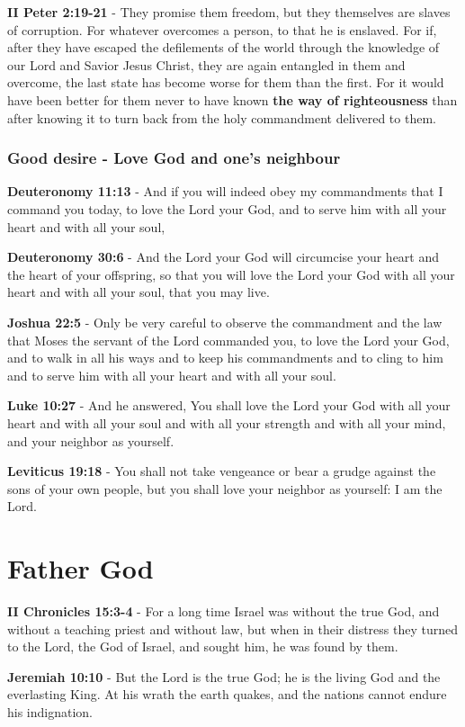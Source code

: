\documentclass[11pt]{article}
\begin{document}
\textbf{II Peter 2:19-21} - They promise them freedom, but they themselves are slaves of corruption. For whatever overcomes a person, to that he is enslaved. For if, after they have escaped the defilements of the world through the knowledge of our Lord and Savior Jesus Christ, they are again entangled in them and overcome, the last state has become worse for them than the first. For it would have been better for them never to have known \textbf{the way of righteousness} than after knowing it to turn back from the holy commandment delivered to them.

\subsubsection{Good desire - Love God and one's neighbour}
\label{sec:org56139a3}
\textbf{Deuteronomy 11:13} - And if you will indeed obey my commandments that I command you today, to love the Lord your God, and to serve him with all your heart and with all your soul,

\textbf{Deuteronomy 30:6} - And the Lord your God will circumcise your heart and the heart of your offspring, so that you will love the Lord your God with all your heart and with all your soul, that you may live.

\textbf{Joshua 22:5} - Only be very careful to observe the commandment and the law that Moses the servant of the Lord commanded you, to love the Lord your God, and to walk in all his ways and to keep his commandments and to cling to him and to serve him with all your heart and with all your soul.

\textbf{Luke 10:27} - And he answered, You shall love the Lord your God with all your heart and with all your soul and with all your strength and with all your mind, and your neighbor as yourself.

\textbf{Leviticus 19:18} - You shall not take vengeance or bear a grudge against the sons of your own people, but you shall love your neighbor as yourself: I am the Lord.

\section{Father God}
\label{sec:org27f8e99}
\textbf{II Chronicles 15:3-4} - For a long time Israel was without the true God, and without a teaching priest and without law, but when in their distress they turned to the Lord, the God of Israel, and sought him, he was found by them.

\textbf{Jeremiah 10:10} - But the Lord is the true God; he is the living God and the everlasting King. At his wrath the earth quakes, and the nations cannot endure his indignation.
\end{document}
